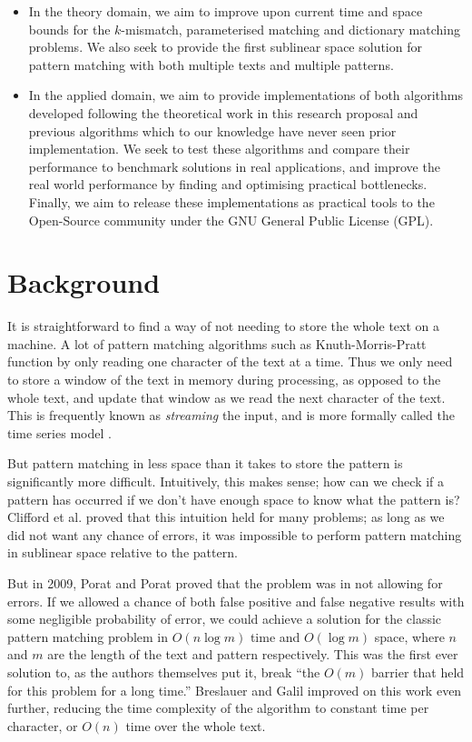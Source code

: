 \documentclass[a4paper,11pt]{article}
\begin{document}
    \begin{itemize}
        \item In the theory domain, we aim to improve upon current time and space bounds for the $k$-mismatch, parameterised matching and dictionary matching problems. We also seek to provide the first sublinear space solution for pattern matching with both multiple texts and multiple patterns.
        \item In the applied domain, we aim to provide implementations of both algorithms developed following the theoretical work in this research proposal and previous algorithms which to our knowledge have never seen prior implementation. We seek to test these algorithms and compare their performance to benchmark solutions in real applications, and improve the real world performance by finding and optimising practical bottlenecks. Finally, we aim to release these implementations as practical tools to the Open-Source community under the GNU General Public License (GPL).
    \end{itemize}

    \section{Background}

    It is straightforward to find a way of not needing to store the whole text on a machine. A lot of pattern matching algorithms such as Knuth-Morris-Pratt \cite{kmp} function by only reading one character of the text at a time. Thus we only need to store a window of the text in memory during processing, as opposed to the whole text, and update that window as we read the next character of the text. This is frequently known as \textit{streaming} the input, and is more formally called the time series model \cite{TCS-002}.

    But pattern matching in less space than it takes to store the pattern is significantly more difficult. Intuitively, this makes sense; how can we check if a pattern has occurred if we don't have enough space to know what the pattern is? Clifford et al.\@ \cite{clifford:black-box} proved that this intuition held for many problems; as long as we did not want any chance of errors, it was impossible to perform pattern matching in sublinear space relative to the pattern.

    But in 2009, Porat and Porat \cite{5438620} proved that the problem was in not allowing for errors. If we allowed a chance of both false positive and false negative results with some negligible probability of error, we could achieve a solution for the classic pattern matching problem in $O(n\log m)$ time and $O(\log m)$ space, where $n$ and $m$ are the length of the text and pattern respectively. This was the first ever solution to, as the authors themselves put it, break ``the $O(m)$ barrier that held for this problem for a long time.'' Breslauer and Galil \cite{Breslauer:2014:RSS:2660854.2635814} improved on this work even further, reducing the time complexity of the algorithm to constant time per character, or $O(n)$ time over the whole text.
\end{document}
